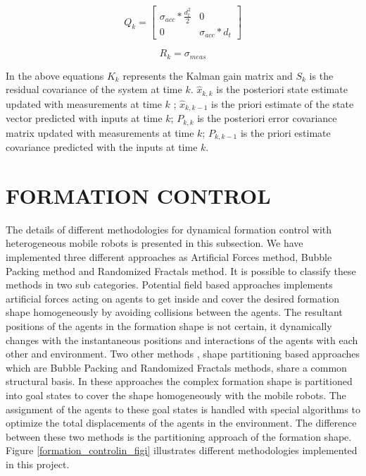 \begin{equation}
Q_k = \begin{bmatrix}
\sigma_{acc} * \frac{d^2_t}{2} & 0 \\
0 & \sigma_{acc} * d_t
\end{bmatrix}
\end{equation}
		
\begin{equation}
R_k = \sigma_{meas}
\end{equation}
		
In the above equations $K_k$ represents the Kalman gain matrix and $S_k$ is the residual covariance of the system at time $k$. $\hat{x}_{k,k}$ is the posteriori state estimate updated with measurements at time $k$ ;  $\hat{x}_{k,k-1}$ is the priori estimate of the state vector predicted with inputs at time $k$; $P_{k,k}$ is the posteriori error covariance matrix updated with measurements at time $k$; $P_{k,k-1}$ is the priori estimate covariance predicted with the inputs at time $k$.
			
\section{FORMATION CONTROL} \label{formation_control_ref}
The details of different methodologies for dynamical formation control with heterogeneous mobile robots is presented in this subsection. We have implemented three different approaches as Artificial Forces method, Bubble Packing method and Randomized Fractals method. It is possible to classify these methods in two sub categories. Potential field based approaches implements artificial forces acting on agents to get inside and cover the desired formation shape homogeneously by avoiding collisions between the agents. The resultant positions of the agents in the formation shape is not certain, it dynamically changes with the instantaneous positions and interactions of the agents with each other and environment. Two other methods , shape partitioning based approaches which are Bubble Packing and Randomized Fractals methods, share a common structural basis. In these approaches the complex formation shape is partitioned into goal states to cover the shape homogeneously with the mobile robots. The assignment of the agents to these goal states is handled with special algorithms to optimize the total displacements of the agents in the environment. The difference between these two methods is the partitioning approach of the formation shape. Figure \ref{formation_controlin_figi} illustrates different methodologies implemented in this project.
		
